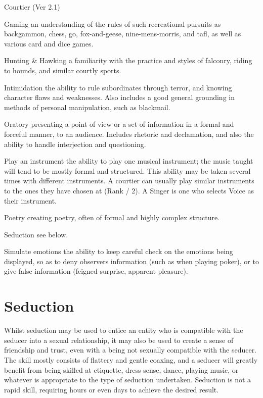 \begin{Chapter}{Courtier (Ver 2.1)}
\begin{Description}
\item[Gaming] an understanding of the rules of such recreational
  pursuits as backgammon, chess, go, fox-and-geese, nine-mens-morris,
  and tafl, as well as various card and dice games.

\item[Hunting \& Hawking] a familiarity with the practice and styles
  of falconry, riding to hounds, and similar courtly sports.

\item[Intimidation] the ability to rule subordinates through terror,
  and knowing character flaws and weaknesses. Also includes a good
  general grounding in methods of personal manipulation, such as
  blackmail.

\item[Oratory] presenting a point of view or a set of information in a
  formal and forceful manner, to an audience.  Includes rhetoric and
  declamation, and also the ability to handle interjection and
  questioning.

\item[Play an instrument] the ability to play one musical instrument;
  the music taught will tend to be mostly formal and structured.  This
  ability may be taken several times with different instruments. A
  courtier can usually play similar instruments to the ones they have
  chosen at (Rank / 2).  A Singer is one who selects Voice as their
  instrument.

\item[Poetry] creating poetry, often of formal and highly complex
  structure.

\item[Seduction] see below. 

\item[Simulate emotions] the ability to keep careful check on the
  emotions being displayed, so as to deny observers information (such
  as when playing poker), or to give false information (feigned
  surprise, apparent pleasure).

\end{Description}

\section{Seduction}

Whilst seduction may be used to entice an entity who is compatible
with the seducer into a sexual relationship, it may also be used to
create a sense of friendship and trust, even with a being not sexually
compatible with the seducer.  The skill mostly consists of flattery
and gentle coaxing, and a seducer will greatly benefit from being
skilled at etiquette, dress sense, dance, playing music, or whatever
is appropriate to the type of seduction undertaken. Seduction is not a
rapid skill, requiring hours or even days to achieve the desired
result.


\end{Chapter}
